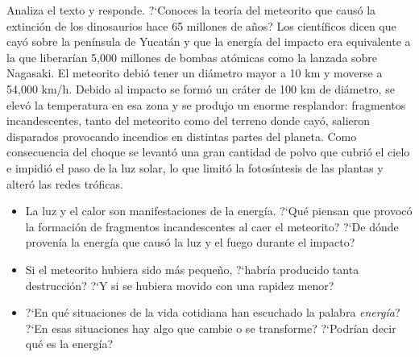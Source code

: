 \documentclass[11pt]{book}
\begin{document}
Analiza el texto y responde.
?`Conoces la teor\'ia del meteorito que caus\'o la extinci\'on de los dinosaurios
hace 65 millones de años? Los cient\'ificos dicen que cay\'o sobre la pen\'insula
de Yucat\'an y que la energ\'ia del impacto era equivalente a la que liberar\'ian
5,000 millones de bombas at\'omicas como la lanzada sobre Nagasaki. El
meteorito debi\'o tener un di\'ametro mayor a 10 km y moverse a 54,000 km/h.
Debido al impacto se form\'o un cr\'ater de 100 km de di\'ametro, se elev\'o
la temperatura en esa zona y se produjo un enorme resplandor: fragmentos
incandescentes, tanto del meteorito como del terreno donde cay\'o, salieron
disparados provocando incendios en distintas partes del planeta.
Como consecuencia del choque se levant\'o una gran cantidad de polvo
que cubri\'o el cielo e impidi\'o el paso de la luz solar, lo que limit\'o la
fotos\'intesis de las plantas y alter\'o las redes tr\'oficas.
\begin{itemize}
    \item La luz y el calor son manifestaciones de la energ\'ia. ?`Qu\'e piensan que
          provoc\'o la formaci\'on de
          fragmentos incandescentes al caer el meteorito? ?`De
          d\'onde proven\'ia la energ\'ia que caus\'o la luz y el fuego durante el impacto?
    \item Si el meteorito hubiera sido m\'as pequeño, ?`habr\'ia producido tanta
          destrucci\'on? ?`Y si se
          hubiera movido con una rapidez menor?
    \item ?`En qu\'e situaciones de la vida cotidiana han escuchado la palabra
          \emph{energ\'ia}? ?`En esas
          situaciones hay algo que cambie o se transforme? ?`Podr\'ian decir qu\'e es la
          energ\'ia?
\end{itemize}

\end{document}
